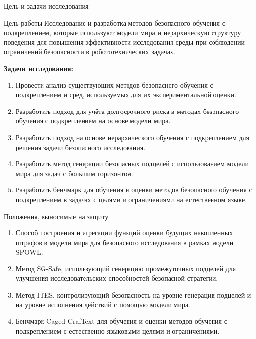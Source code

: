 \begin{frame}{Цель и задачи исследования}
    \small
    \begin{block}{Цель работы}
        Исследование и разработка методов безопасного обучения с подкреплением,
        которые используют модели мира и иерархическую структуру поведения для
        повышения эффективности исследования среды при соблюдении ограничений
        безопасности в робототехнических задачах.
    \end{block}

    \footnotesize
    \textbf{Задачи исследования:}
    \begin{enumerate}
        \item Провести анализ существующих методов безопасного обучения с
              подкреплением и сред, используемых для их экспериментальной
              оценки.
        \item Разработать подход для учёта долгосрочного риска в методах
              безопасного обучения с подкреплением на основе модели мира.
        \item Разработать подход на основе иерархического обучения с
              подкреплением для решения задачи безопасного исследования.
        \item Разработать метод генерации безопасных подцелей с использованием
              модели мира для задач с большим горизонтом.
        \item Разработать бенчмарк для обучения и оценки методов безопасного
              обучения с подкреплением в задачах с целями и ограничениями на
              естественном языке.
    \end{enumerate}
\end{frame}

\begin{frame}{Положения, выносимые на защиту}
    \small
    \begin{enumerate}
        \item Способ построения и агрегации функций оценки будущих накопленных
              штрафов в модели мира для безопасного исследования в рамках
              модели SPOWL.
        \item Метод SG-Safe, использующий генерацию промежуточных подцелей для
              улучшения исследовательских способностей безопасной стратегии.
        \item Метод ITES, контролирующий безопасность на уровне генерации
              подцелей и на уровне исполнения действий с помощью модели мира.
        \item Бенчмарк Caged CrafText для обучения и оценки методов обучения с
              подкреплением с естественно-языковыми целями и ограничениями.
    \end{enumerate}
\end{frame}

